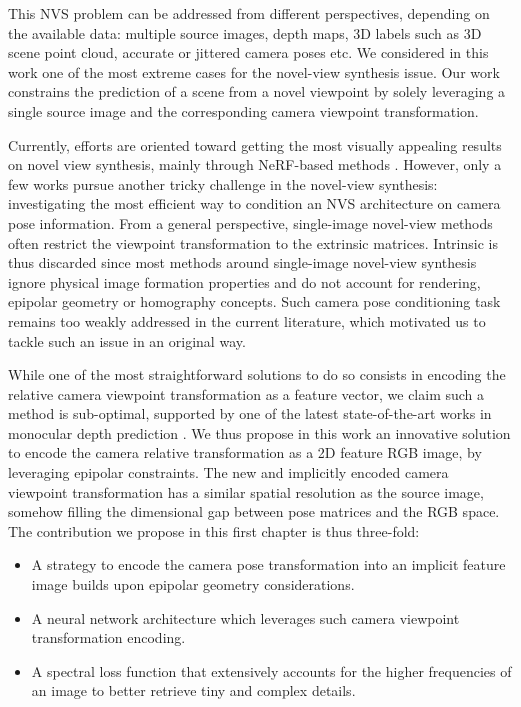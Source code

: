 This \ac{NVS} problem can be addressed from different perspectives, depending on the available data: multiple source images, depth maps, 3D labels such as 3D scene point cloud, accurate or jittered camera poses etc. We considered in this work one of the most extreme cases for the novel-view synthesis issue. Our work constrains the prediction of a scene from a novel viewpoint by solely leveraging a single source image and the corresponding camera viewpoint transformation. 

Currently, efforts are oriented toward getting the most visually appealing results on novel view synthesis, mainly through NeRF-based methods \citep{mildenhall2020nerf,wang2021neus,barron2021mip,barron2022mip}. However, only a few works pursue another tricky challenge in the novel-view synthesis: investigating the most efficient way to condition an NVS architecture on camera pose information. From a general perspective, single-image novel-view methods often restrict the viewpoint transformation to the extrinsic matrices. Intrinsic is thus discarded since most methods around single-image novel-view synthesis ignore physical image formation properties and do not account for rendering, epipolar geometry or homography concepts. Such camera pose conditioning task remains too weakly addressed in the current literature, which motivated us to tackle such an issue in an original way.

While one of the most straightforward solutions to do so consists in encoding the relative camera viewpoint transformation as a feature vector, we claim such a method is sub-optimal, supported by one of the latest state-of-the-art works in monocular depth prediction \citep{zhao2021camera}. We thus propose in this work an innovative solution to encode the camera relative transformation as a 2D feature RGB image, by leveraging epipolar constraints. The new and implicitly encoded camera viewpoint transformation has a similar spatial resolution as the source image, somehow filling the dimensional gap between pose matrices and the RGB space. The contribution we propose in this first chapter is thus three-fold: 
\begin{itemize}
	\item A strategy to encode the camera pose transformation into an implicit feature image builds upon epipolar geometry considerations. 
	\item A neural network architecture which leverages such camera viewpoint transformation encoding. 
	\item A spectral loss function that extensively accounts for the higher frequencies of an image to better retrieve tiny and complex details.
\end{itemize}

